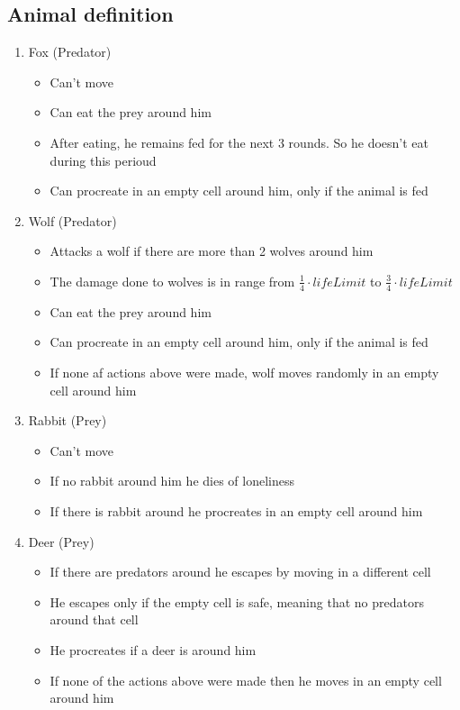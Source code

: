 \documentclass[11pt]{article}
\begin{document}
\subsection*{Animal definition}
\begin{enumerate}
\item
Fox (Predator)
	\begin{itemize}
	\item
		Can't move
	\item
		Can eat the prey around him
	\item
		After eating, he remains fed for the next 3 rounds. So he doesn't eat during this perioud
	\item
		Can procreate in an empty cell around him, only if the animal is fed
	\end{itemize}
\item
Wolf (Predator)
	\begin{itemize}
	\item
		Attacks a wolf if there are more than 2 wolves around him
	\item
		The damage done to wolves is in range from $\frac{1}{4}\cdot lifeLimit$ to $\frac{3}{4}\cdot lifeLimit$
	\item
		Can eat the prey around him
	\item
		Can procreate in an empty cell around him, only if the animal is fed
	\item
		If none af actions above were made, wolf moves randomly in an empty cell around him
	\end{itemize}
\item
Rabbit (Prey)
	\begin{itemize}
	\item
		Can't move
	\item
		If no rabbit around him he dies of loneliness
	\item
		If there is rabbit around he procreates in an empty cell around him
	\end{itemize}
\item
Deer (Prey)
	\begin{itemize}
	\item
		If there are predators around he escapes by moving in a different cell
	\item
		He escapes only if the empty cell is safe, meaning that no predators around that cell
	\item
		He procreates if a deer is around him
	\item
		If none of the actions above were made then he moves in an empty cell around him
	\end{itemize}
\end{enumerate}
\end{document}
